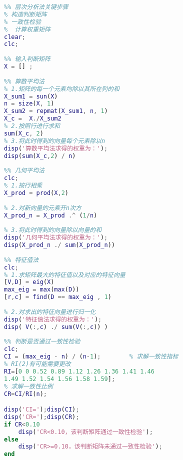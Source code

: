 \documentclass[UTF8]{ctexart}
\begin{document}
\begin{lstlisting}[language=Matlab]
%% AHP
%% 层次分析法关键步骤
% 构造判断矩阵
% 一致性检验
%  计算权重矩阵
clear;
clc;
    
%% 输入判断矩阵
X = [] ;
    
%% 算数平均法
% 1.矩阵的每一个元素均除以其所在列的和
X_sum1 = sun(X)
n = size(X, 1)
X_sum2 = repmat(X_sum1, n, 1) 
X_c =  X./X_sum2
% 2.按照行进行求和
sum(X_c, 2)
% 3.将此时得到的向量每个元素除以n
disp('算数平均法求得的权重为：');
disp(sum(X_c,2) / n)
    
%% 几何平均法
clc;
% 1.按行相乘
X_prod = prod(X,2)
    
% 2.对新向量的元素开n次方
X_prod_n = X_prod .^ (1/n)
    
% 3.将此时得到的向量除以向量的和
disp('几何平均法求得的权重为：');
disp(X_prod_n ./ sum(X_prod_n))
    
%% 特征值法
clc;
% 1.求矩阵最大的特征值以及对应的特征向量
[V,D] = eig(X)  
max_eig = max(max(D))
[r,c] = find(D == max_eig , 1) 
    
% 2.对求出的特征向量进行归一化
disp('特征值法求得的权重为：');
disp( V(:,c) ./ sum(V(:,c)) )
    
%% 判断是否通过一致性检验
clc;
CI = (max_eig - n) / (n-1);        % 求解一致性指标
% RI(2)有可能需要更改
RI=[0 0 0.52 0.89 1.12 1.26 1.36 1.41 1.46 
1.49 1.52 1.54 1.56 1.58 1.59];   
% 求解一致性比例
CR=CI/RI(n);                              

disp('CI=');disp(CI);
disp('CR=');disp(CR);
if CR<0.10
    disp('CR<0.10，该判断矩阵通过一致性检验');
else
    disp('CR>=0.10，该判断矩阵未通过一致性检验');
end

\end{lstlisting} 
\end{document}
